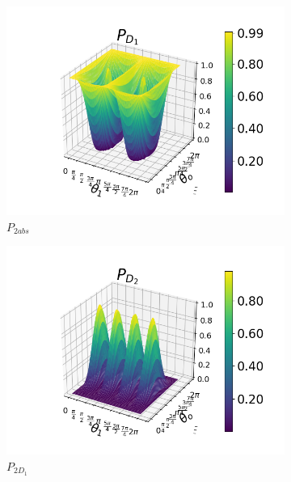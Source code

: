 \documentclass[12pt]{book}
\begin{document}
 \begin{figure}[H]
\centering
\begin{subfigure}[b]{0.4\linewidth}
\includegraphics[width=\linewidth]{images/PD1_BS_v.png}
\caption{$P_{2abs}$}
\label{fig:BS2}
\end{subfigure}
\begin{subfigure}[b]{0.4\linewidth}
\includegraphics[width=\linewidth]{images/PD2_BS_v.png}
\caption{$P_{2D_{1}}$}
\label{fig:westminster_aerea}
\end{subfigure}
\begin{subfigure}[b]{0.4\linewidth}

\end{subfigure}
\end{figure}
\end{document}
